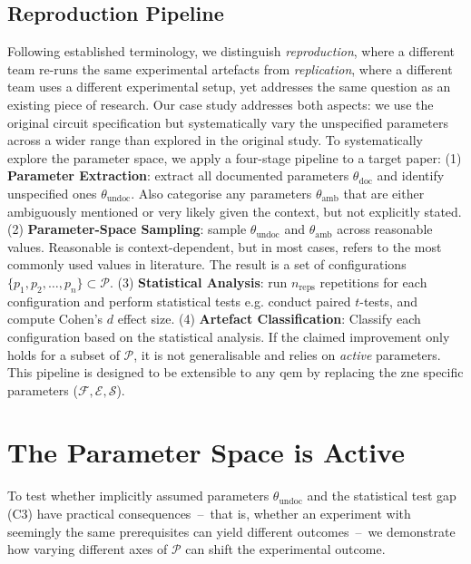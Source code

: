 \documentclass[10pt,conference]{IEEEtran}
\begin{document}
\subsection{Reproduction Pipeline}
\label{subsec:pipeline}
Following established terminology, we distinguish \emph{reproduction}, where a different team re-runs the same experimental artefacts from \emph{replication}, where a different team uses a different experimental setup, yet addresses the same question as an existing piece of research. Our case study addresses both aspects: we use the original circuit specification but systematically vary the unspecified parameters across a wider range than explored in the original study.
To systematically explore the parameter space, we apply a four-stage pipeline to a target paper: (1) \textbf{Parameter Extraction}: extract all documented parameters $\theta_\text{doc}$ and identify unspecified ones $\theta_\text{undoc}$. Also categorise any parameters $\theta_\text{amb}$ that are either ambiguously mentioned or very likely given the context, but not explicitly stated. (2) \textbf{Parameter-Space Sampling}: sample $\theta_\text{undoc}$ and $\theta_\text{amb}$ across reasonable values. Reasonable is context-dependent, but in most cases, refers to the most commonly used values in literature. The result is a set of configurations $\{p_1, p_2, \ldots, p_n\} \subset \mathcal{P}$. (3) \textbf{Statistical Analysis}: run $n_\text{reps}$ repetitions for each configuration and perform statistical tests e.g. conduct paired $t$-tests, and compute Cohen's $d$ effect size. (4) \textbf{Artefact Classification}: Classify each configuration based on the statistical analysis. If the claimed improvement only holds for a subset of $\mathcal{P}$, it is not generalisable and relies on \emph{active} parameters. This pipeline is designed to be extensible to any \gls{qem} by replacing the \gls{zne} specific parameters ($\mathcal{F}, \mathcal{E}, \mathcal{S}$).

\section{The Parameter Space is Active}
\label{sec:experiments_khan}
To test whether implicitly assumed parameters $\theta_\text{undoc}$ and the statistical test gap (C3) have practical consequences~--~that is, whether an experiment with seemingly the same prerequisites can yield different outcomes~--~we demonstrate how varying different axes of $\mathcal{P}$ can shift the experimental outcome. 
\end{document}
